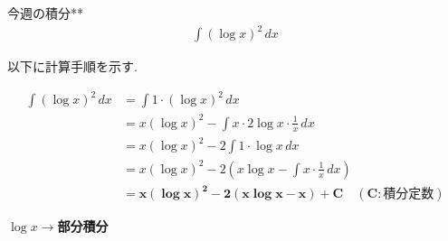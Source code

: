 \documentclass[main]{subfiles}
\begin{document}

\begin{mondai}{9}{今週の積分}{**}
    \begin{align*}
        \int (\log x)^2 \, dx
    \end{align*}
\end{mondai}


\solutionhead
\hfill
以下に計算手順を示す.
\hfill\

\begin{align*}
\int (\log x)^2 \, dx &= \int 1 \cdot (\log x)^2 \, dx \\
&= x(\log x)^2 - \int x \cdot 2 \log x \cdot \frac{1}{x} \, dx \\
&= x(\log x)^2 - 2 \int 1\cdot \log x \, dx \\
&= x(\log x)^2 - 2 \left( x \log x - \int x \cdot \frac{1}{x} \, dx \right) \\
&= \boldsymbol{x(\log x)^2 - 2(x \log x - x) + C \quad (C:\textbf{積分定数})}
\end{align*}

\begin{focusbox}
\centering
\textbf{$\log x\rightarrow$部分積分}
\end{focusbox}
\end{document}
